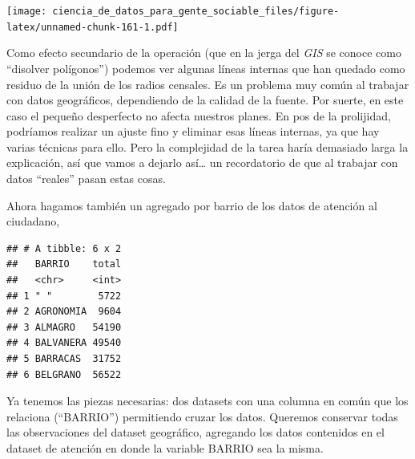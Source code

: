 \documentclass[spanish,]{book}
\newenvironment{Shaded}{\begin{snugshade}}{\end{snugshade}}
\newcommand{\DataTypeTok}[1]{\textcolor[rgb]{0.13,0.29,0.53}{#1}}
\newcommand{\KeywordTok}[1]{\textcolor[rgb]{0.13,0.29,0.53}{\textbf{#1}}}
\newcommand{\NormalTok}[1]{#1}
\newcommand{\OperatorTok}[1]{\textcolor[rgb]{0.81,0.36,0.00}{\textbf{#1}}}
\newcommand{\StringTok}[1]{\textcolor[rgb]{0.31,0.60,0.02}{#1}}
\begin{document}
\texttt{[image: ciencia\_de\_datos\_para\_gente\_sociable\_files/figure-latex/unnamed-chunk-161-1.pdf]}

Como efecto secundario de la operación (que en la jerga del \emph{GIS} se conoce como ``disolver polígonos'') podemos ver algunas líneas internas que han quedado como residuo de la unión de los radios censales. Es un problema muy común al trabajar con datos geográficos, dependiendo de la calidad de la fuente. Por suerte, en este caso el pequeño desperfecto no afecta nuestros planes. En pos de la prolijidad, podríamos realizar un ajuste fino y eliminar esas líneas internas, ya que hay varias técnicas para ello. Pero la complejidad de la tarea haría demasiado larga la explicación, así que vamos a dejarlo así\ldots{} un recordatorio de que al trabajar con datos ``reales'' pasan estas cosas.

Ahora hagamos también un agregado por barrio de los datos de atención al ciudadano,

\begin{Shaded}
\end{Shaded}

\begin{verbatim}
## # A tibble: 6 x 2
##   BARRIO    total
##   <chr>     <int>
## 1 " "        5722
## 2 AGRONOMIA  9604
## 3 ALMAGRO   54190
## 4 BALVANERA 49540
## 5 BARRACAS  31752
## 6 BELGRANO  56522
\end{verbatim}

Ya tenemos las piezas necesarias: dos datasets con una columna en común que los relaciona (``BARRIO'') permitiendo cruzar los datos. Queremos conservar todas las observaciones del dataset geográfico, agregando los datos contenidos en el dataset de atención en donde la variable BARRIO sea la misma.

\begin{Shaded}
\end{Shaded}
\end{document}
